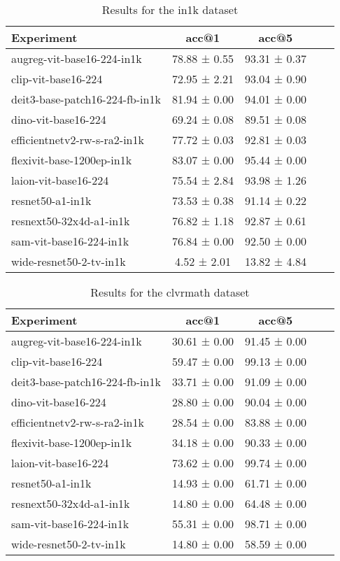 \begin{table}[htbp]
\caption{Results for the in1k dataset}
\begin{tabular}{|l|c|c|c|c|}\hline
Experiment & acc@1 & acc@5\\
\hline
augreg-vit-base16-224-in1k & 78.88 ± 0.55 & 93.31 ± 0.37\\
\hline
clip-vit-base16-224 & 72.95 ± 2.21 & 93.04 ± 0.90\\
\hline
deit3-base-patch16-224-fb-in1k & 81.94 ± 0.00 & 94.01 ± 0.00\\
\hline
dino-vit-base16-224 & 69.24 ± 0.08 & 89.51 ± 0.08\\
\hline
efficientnetv2-rw-s-ra2-in1k & 77.72 ± 0.03 & 92.81 ± 0.03\\
\hline
flexivit-base-1200ep-in1k & 83.07 ± 0.00 & 95.44 ± 0.00\\
\hline
laion-vit-base16-224 & 75.54 ± 2.84 & 93.98 ± 1.26\\
\hline
resnet50-a1-in1k & 73.53 ± 0.38 & 91.14 ± 0.22\\
\hline
resnext50-32x4d-a1-in1k & 76.82 ± 1.18 & 92.87 ± 0.61\\
\hline
sam-vit-base16-224-in1k & 76.84 ± 0.00 & 92.50 ± 0.00\\
\hline
wide-resnet50-2-tv-in1k & 4.52 ± 2.01 & 13.82 ± 4.84\\
\hline
\end{tabular}
\end{table}

\begin{table}[htbp]
\caption{Results for the clvrmath dataset}
\begin{tabular}{|l|c|c|c|c|}\hline
Experiment & acc@1 & acc@5\\
\hline
augreg-vit-base16-224-in1k & 30.61 ± 0.00 & 91.45 ± 0.00\\
\hline
clip-vit-base16-224 & 59.47 ± 0.00 & 99.13 ± 0.00\\
\hline
deit3-base-patch16-224-fb-in1k & 33.71 ± 0.00 & 91.09 ± 0.00\\
\hline
dino-vit-base16-224 & 28.80 ± 0.00 & 90.04 ± 0.00\\
\hline
efficientnetv2-rw-s-ra2-in1k & 28.54 ± 0.00 & 83.88 ± 0.00\\
\hline
flexivit-base-1200ep-in1k & 34.18 ± 0.00 & 90.33 ± 0.00\\
\hline
laion-vit-base16-224 & 73.62 ± 0.00 & 99.74 ± 0.00\\
\hline
resnet50-a1-in1k & 14.93 ± 0.00 & 61.71 ± 0.00\\
\hline
resnext50-32x4d-a1-in1k & 14.80 ± 0.00 & 64.48 ± 0.00\\
\hline
sam-vit-base16-224-in1k & 55.31 ± 0.00 & 98.71 ± 0.00\\
\hline
wide-resnet50-2-tv-in1k & 14.80 ± 0.00 & 58.59 ± 0.00\\
\hline
\end{tabular}
\end{table}

